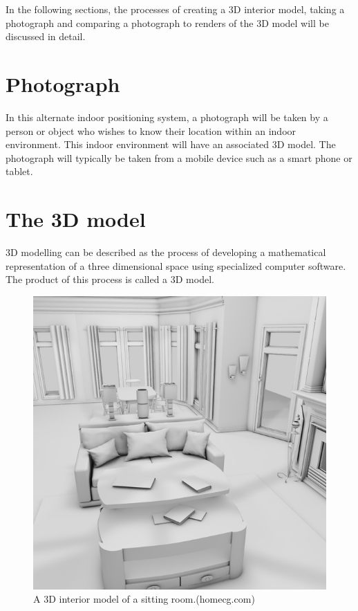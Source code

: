 \documentclass[11pt,a4paper]{report}
\begin{document}
	In the following sections, the processes of creating a 3D interior model, taking a photograph and comparing a photograph to renders of the 3D model will be discussed in detail.
	
	\section{Photograph}
		In this alternate indoor positioning system, a photograph will be taken by a person or object who wishes to know their location within an indoor environment. This indoor environment will have an associated 3D model. The photograph will typically be taken from a mobile device such as a smart phone or tablet.
	
	\newpage
	\section{The 3D model}
		3D modelling can be described as the process of developing a mathematical representation of a three dimensional space using specialized computer software. The product of this process is called a 3D model. 
		
		\begin{figure}[H]
			\centering
			\includegraphics[width=1\textwidth]{3d_interior_model}
			\caption[3D interior model]{A 3D interior model of a sitting room.(homecg.com)}
			\label{fig:3d_interior_model}
		\end{figure}
		
\end{document}
